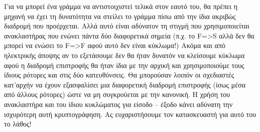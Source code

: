 \documentclass[a4paper,twoside,12pt]{article}
\begin{document}
Για να μπορεί ένα γράμμα να αντιστοιχιστεί τελικά στον εαυτό του, θα πρέπει η μηχανή να έχει τη δυνατότητα να στείλει το γράμμα πίσω από την ίδια ακριβώς διαδρομή που προέρχεται. Αλλά αυτό είναι αδύνατον τη στιγμή που χρησιμοποιείται ανακλαστήρας που ενώνει πάντα δύο διαφορετικά σημεία (π.χ. το F=>S αλλά δεν θα μπορεί να ενώσει το F=>F αφού αυτό δεν είναι κύκλωμα!) Ακόμα και από ηλεκτρικής άποψης αν το εξετάσουμε δεν θα ήταν δυνατόν να κλείσουμε κύκλωμα αφού η διαδρομή επιστροφής θα ήταν ίδια με την αρχική και χρησιμοποιούμε τους ίδιους ρότορες και στις δύο κατευθύνσεις. Θα μπορούσαν λοιπόν οι σχεδιαστές κατ'αρχήν να έχουν εξασφαλίσει μια διαφορετική διαδρομή επιστροφής (ίσως μέσα από άλλους ρότορες) ώστε να μη συγκρούεται με την κανονική. Η χρήση του ανακλαστήρα και του ίδιου κυκλώματος για είσοδο – έξοδο κάνει αδύνατη την ισχυρότερη αυτή κρυπτογράφηση. Ας ευχαριστήσουμε τον κατασκευαστή για αυτό του το λάθος!
\end{document}
